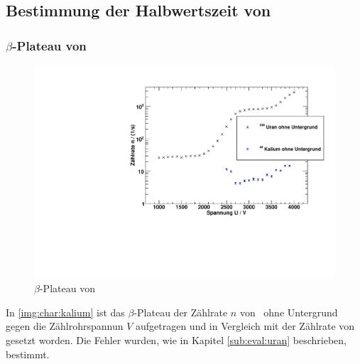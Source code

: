 \subsection{Bestimmung der Halbwertszeit von \kalium}
\subsubsection{$\beta$-Plateau von \kalium}
\begin{figure}[H]
\begin{center}
  \includegraphics[width=15cm]{../img/Kalium40_Charakteristik.pdf}
  \caption[$\beta$-Plateau mit \kalium]{$\beta$-Plateau von \kalium}
  \label{img:char:kalium}
\end{center}
\end{figure}
In \autoref{img:char:kalium} ist das $\beta$-Plateau der Zählrate $n$ von \kalium\, ohne Untergrund gegen die Zählrohrspannun $V$ aufgetragen 
und in Vergleich mit der Zählrate von \uran\, gesetzt worden. Die Fehler wurden, wie in Kapitel \ref{sub:eval:uran} beschrieben, bestimmt.

